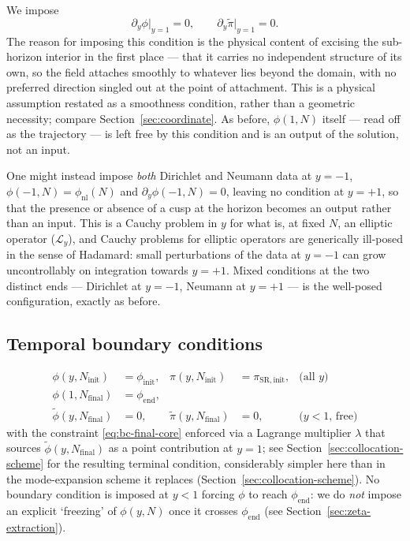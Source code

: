 \documentclass[a4paper,11pt]{article}
\newcommand{\semibold}[1]{{\fontseries{b}\selectfont{#1}}}
\newcommand{\para}[1]{\par\vspace{2mm}\noindent\semibold{{#1.}---}\ignorespaces}
\newenvironment{panel}{\begin{tcolorbox}[enhanced,breakable,colback=gray!10,colframe=gray!30]\small}{\end{tcolorbox}}
\newcommand{\Ny}{N}                          %
\newcommand{\Ninit}{N_{\mathrm{init}}}       %
\newcommand{\Nfinal}{N_{\mathrm{final}}}     %
\newcommand{\field}{\phi}                    %
\newcommand{\mom}{\pi}                       %
\newcommand{\phinl}{\field_{\mathrm{nl}}}    %
\newcommand{\phiinit}{\field_{\mathrm{init}}}
\newcommand{\phiend}{\field_{\mathrm{end}}}
\newcommand{\rfield}{\widetilde\field}       %
\newcommand{\rmom}{\widetilde\mom}           %
\newcommand{\yco}{y}                         %
\newcommand{\Lop}{\mathcal{L}_\yco}          %
\newcommand{\lag}{\lambda}                   %
\begin{document}
\para{At $\yco=+1$ (current horizon)} We impose
\begin{equation}
    \partial_\yco \field \big|_{\yco=1} = 0 ,
    \qquad
    \partial_\yco \rmom \big|_{\yco=1} = 0 .
    \label{eq:bc-core}
\end{equation}
The reason for imposing this condition
is the physical
content of excising the sub-horizon interior in the first place --- that
it carries no independent structure of its own, so the field attaches
smoothly to whatever lies beyond the domain, with no preferred direction
singled out at the point of attachment. This is a physical assumption
restated as a smoothness condition, rather than a geometric necessity;
compare Section~\ref{sec:coordinate}. As before, $\field(1,\Ny)$ itself
--- read off as the trajectory --- is left free by this condition and is
an output of the solution, not an input.

\begin{panel}
\semibold{A rejected alternative.} One might instead impose \emph{both}
Dirichlet and Neumann data at $\yco=-1$,
$\field(-1,\Ny)=\phinl(\Ny)$ and $\partial_\yco\field(-1,\Ny)=0$, leaving
no condition at $\yco=+1$, so that the presence or absence of a cusp at
the horizon becomes an output rather than an input. This is a Cauchy
problem in $\yco$ for what is, at fixed $\Ny$, an elliptic operator
($\Lop$), and Cauchy problems for elliptic operators are generically
ill-posed in the sense of Hadamard: small perturbations of the data at
$\yco=-1$ can grow uncontrollably on integration towards $\yco=+1$. Mixed
conditions at the two distinct ends --- Dirichlet at $\yco=-1$, Neumann at
$\yco=+1$ --- is the well-posed configuration, exactly as before.
\end{panel}

\subsection{Temporal boundary conditions}

\begin{align}
    \field(\yco,\Ninit) & = \phiinit ,
    &
    \mom(\yco,\Ninit) & = \mom_{\mathrm{SR,init}} ,
    &
    \text{(all } \yco \text{)}
    \label{eq:bc-init}
    \\
    \field(1,\Nfinal) & = \phiend ,
    & & &
    \label{eq:bc-final-core}
    \\
    \rfield(\yco,\Nfinal) & = 0 ,
    &
    \rmom(\yco,\Nfinal) & = 0 ,
    &
    \text{(}\yco<1\text{, free)}
    \label{eq:bc-final-free}
\end{align}
with the constraint \eqref{eq:bc-final-core} enforced via a Lagrange
multiplier $\lag$ that sources $\rfield(\yco,\Nfinal)$ as a point
contribution at $\yco=1$; see Section~\ref{sec:collocation-scheme} for
the resulting terminal condition, considerably simpler here than in the
mode-expansion scheme it replaces (Section~\ref{sec:collocation-scheme}).
No boundary condition is imposed at $\yco<1$ forcing $\field$ to reach
$\phiend$: we do \emph{not} impose an explicit `freezing' of
$\field(\yco,\Ny)$ once it crosses $\phiend$ (see
Section~\ref{sec:zeta-extraction}).
\end{document}
